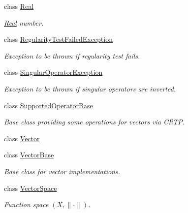 \begin{DoxyCompactItemize}
class \hyperlink{classSpacy_1_1Real}{Real}
\begin{DoxyCompactList}\small\item\em \hyperlink{classSpacy_1_1Real}{Real} number. \end{DoxyCompactList}\item 
class \hyperlink{classSpacy_1_1RegularityTestFailedException}{Regularity\+Test\+Failed\+Exception}
\begin{DoxyCompactList}\small\item\em Exception to be thrown if regularity test fails. \end{DoxyCompactList}\item 
class \hyperlink{classSpacy_1_1SingularOperatorException}{Singular\+Operator\+Exception}
\begin{DoxyCompactList}\small\item\em Exception to be thrown if singular operators are inverted. \end{DoxyCompactList}\item 
class \hyperlink{classSpacy_1_1SupportedOperatorBase}{Supported\+Operator\+Base}
\begin{DoxyCompactList}\small\item\em Base class providing some operations for vectors via C\+R\+T\+P. \end{DoxyCompactList}\item 
class \hyperlink{classSpacy_1_1Vector}{Vector}
\item 
class \hyperlink{classSpacy_1_1VectorBase}{Vector\+Base}
\begin{DoxyCompactList}\small\item\em Base class for vector implementations. \end{DoxyCompactList}\item 
class \hyperlink{classSpacy_1_1VectorSpace}{Vector\+Space}
\begin{DoxyCompactList}\small\item\em Function space $(X,\|\cdot\|)$. \end{DoxyCompactList}\end{DoxyCompactItemize}
